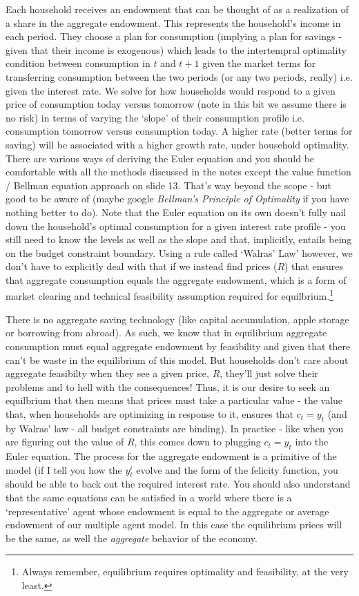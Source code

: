 \documentclass[authoryear,11pt]{elsarticle}
\begin{document}
Each household receives an endowment that can be thought of as a realization of a share in the aggregate endowment. This represents the household's income in each period. They choose a plan for consumption (implying a plan for savings - given that their income is exogenous) which leads to the intertempral optimality condition between consumption in $t$ and $t+1$ given the market terms for transferring consumption between the two periods (or any two periods, really) i.e. given the interest rate. We solve for how households would respond to a given price of consumption today versus tomorrow (note in this bit we assume there is no risk) in terms of varying the `slope' of their consumption profile i.e. consumption tomorrow versus consumption today. A higher rate (better terms for saving) will be associated with a higher growth rate, under household optimality. There are various ways of deriving the Euler equation and you should be comfortable with all the methods discussed in the notes except the value function / Bellman equation approach on slide 13. That's way beyond the scope - but good to be aware of (maybe google \textit{Bellman's Principle of Optimality} if you have nothing better to do). Note that the Euler equation on its own doesn't fully nail down the household's optimal consumption for a given interest rate profile - you still need to know the levels as well as the slope and that, implicitly, entails being on the budget constraint boundary. Using a rule called `Walras' Law' however, we don't have to explicitly deal with that if we instead find prices ($R$) that ensures that aggregate consumption equals the aggregate endowment, which is a form of market clearing and technical feasibility assumption required for equilbrium.\footnote{Always remember, equilibrium requires optimality and feasibility, at the very least.}

There is no aggregate saving technology (like capital accumulation, apple storage or borrowing from abroad). As such, we know that in equilibrium aggregate consumption must equal aggregate endowment by feasibility and given that there can't be waste in the equilibrium of this model. But households don't care about aggregate feasibilty when they see a given price, $R$, they'll just solve their problems and to hell with the consequences! Thus, it is our desire to seek an equilbrium that then means that prices must take a particular value - the value that, when households are optimizing in response to it, ensures that $c_{t}=y_{t}$ (and by Walras' law - all budget constraints are binding). In practice - like when you are figuring out the value of $R$, this comes down to plugging $c_{t}=y_{t}$ into the Euler equation. The process for the aggregate endowment is a primitive of the model (if I tell you how the $y_{t}^{i}$ evolve and the form of the felicity function, you should be able to back out the required interest rate. You should also understand that the same equations can be satisfied in a world where there is a `representative' agent whose endowment is equal to the aggregate or average endowment of our multiple agent model. In this case the equilibrium prices will be the same, as well the \textit{aggregate} behavior of the economy.
\end{document}
